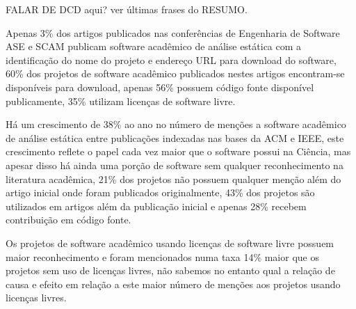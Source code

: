 \label{conclusoes}



FALAR DE DCD aqui? ver últimas frases do RESUMO.


Apenas 3\% dos artigos publicados nas conferências de Engenharia de Software
ASE e SCAM publicam software acadêmico de análise estática com a identificação
do nome do projeto e endereço URL para download do software, 60\% dos projetos
de software acadêmico publicados nestes artigos encontram-se disponíveis para
download, apenas 56\% possuem código fonte disponível publicamente, 35\%
utilizam licenças de software livre.



Há um crescimento de 38\% ao ano no número de menções a software acadêmico de
análise estática entre publicações indexadas nas bases da ACM e IEEE, este
crescimento reflete o papel cada vez maior que o software possui na Ciência,
mas apesar disso há ainda uma porção de software sem qualquer reconhecimento na
literatura acadêmica, 21\% dos projetos não possuem qualquer menção além do
artigo inicial onde foram publicados originalmente, 43\% dos projetos são
utilizados em artigos além da publicação inicial e apenas 28\% recebem
contribuição em código fonte.


Os projetos de software acadêmico usando licenças de software livre possuem
maior reconhecimento e foram mencionados numa taxa 14\% maior que os projetos
sem uso de licenças livres, não sabemos no entanto qual a relação de causa e
efeito em relação a este maior número de menções aos projetos usando licenças
livres.


